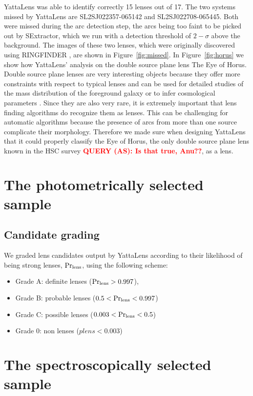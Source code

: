\documentclass[a4paper,fleqn,usenatbib]{mnras}
\def\Fref#1{Figure~\ref{#1}\xspace}
\def\pr{{\rm Pr}}
\def\plens{\pr_{\mathrm{lens}}}
\newcommand{\comment}[2]{\textcolor{red}{\textbf{QUERY (#1): #2}}}
\begin{document}
YattaLens was able to identify correctly 15 lenses out of 17. The two systems missed by YattaLens are SL2SJ022357-065142 and SL2SJ022708-065445. Both were missed during the arc detection step, the arcs being too faint to be picked out by SExtractor, which we run with a detection threshold of $2-\sigma$ above the background.
The images of these two lenses, which were originally discovered using RINGFINDER \citep{Gav++14}, are shown in \Fref{fig:missed}.
In \Fref{fig:horus} we show how YattaLens' analysis on the double source plane lens The Eye of Horus.
Double source plane lenses are very interesting objects because they offer more constraints with respect to typical lenses and can be used for detailed studies of the mass distribution of the foreground galaxy \citep[e.g.][]{Son++12} or to infer cosmological parameters \citep{C+A14}.
Since they are also very rare, it is extremely important that lens finding algorithms do recognize them as lenses. This can be challenging for automatic algorithms because the presence of arcs from more than one source complicate their morphology.
Therefore we made sure when designing YattaLens that it could properly classify the Eye of Horus, the only double source plane lens known in the HSC survey \comment{AS}{Is that true, Anu??}, as a lens.

\section{The photometrically selected sample}

\subsection{Candidate grading}
We graded lens candidates output by YattaLens according to their likelihood of being strong lenses, $\plens$, using the following scheme:
\begin{itemize}
\item Grade A: definite lenses ($\plens > 0.997$), 
\item Grade B: probable lenses ($0.5 < \plens < 0.997$)
\item Grade C: possible lenses ($0.003 < \plens < 0.5$)
\item Grade 0: non lenses ($plens < 0.003$)
\end{itemize}

\section{The spectroscopically selected sample}
\end{document}
